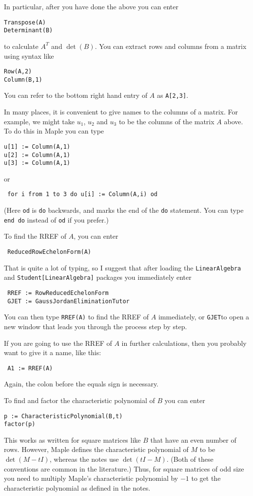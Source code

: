 \documentclass{amsart}
\begin{document}
In particular, after you have done the above you can enter
\begin{verbatim}
Transpose(A)
Determinant(B)
\end{verbatim}
to calculate $A^T$ and $\det(B)$.  You can extract rows and columns
from a matrix using syntax like
\begin{verbatim}
Row(A,2)
Column(B,1)
\end{verbatim}
You can refer to the bottom right hand entry of $A$ as \verb+A[2,3]+.

In many places, it is convenient to give names to the columns of a
matrix.  For example, we might take $u_1$, $u_2$ and $u_3$ to be the
columns of the matrix $A$ above.  To do this in Maple you can type
\begin{verbatim}
u[1] := Column(A,1)
u[2] := Column(A,1)
u[3] := Column(A,1)
\end{verbatim}
or
\begin{verbatim}
 for i from 1 to 3 do u[i] := Column(A,i) od
\end{verbatim}
(Here \verb+od+ is \verb+do+ backwards, and marks the end of the
\verb+do+ statement.  You can type \verb+end do+ instead of \verb+od+
if you prefer.)

To find the RREF of $A$, you can enter 
\begin{verbatim}
 ReducedRowEchelonForm(A)
\end{verbatim}
That is quite a lot of typing, so I suggest that after loading the
\verb+LinearAlgebra+ and \verb+Student[LinearAlgebra]+ packages you
immediately enter
\begin{verbatim}
 RREF := RowReducedEchelonForm
 GJET := GaussJordanEliminationTutor
\end{verbatim}
You can then type \verb+RREF(A)+ to find the RREF of $A$ immediately,
or \verb+GJET+to open a new window that leads you through the process
step by step.

If you are going to use the RREF of $A$ in further calculations, then
you probably want to give it a name, like this:
\begin{verbatim}
 A1 := RREF(A)
\end{verbatim}
Again, the colon before the equals sign is necessary.

To find and factor the characteristic polynomial of $B$ you can enter 
\begin{verbatim}
p := CharacteristicPolynomial(B,t)
factor(p)
\end{verbatim}
This works as written for square matrices like $B$ that have an even
number of rows.  However, Maple defines the characteristic polynomial
of $M$ to be $\det(M-tI)$, whereas the notes use $\det(tI-M)$.  (Both
of these conventions are common in the literature.)  Thus, for square
matrices of odd size you need to multiply Maple's characteristic
polynomial by $-1$ to get the characteristic polynomial as defined in
the notes.  
\end{document}
